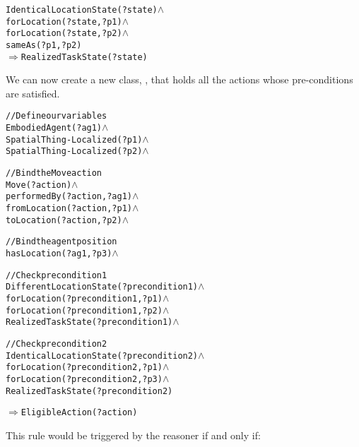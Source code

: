 \begin{alltt}

IdenticalLocationState(?state) \(\land\)
forLocation(?state, ?p1) \(\land\)
forLocation(?state, ?p2) \(\land\)
sameAs(?p1, ?p2)
\(\Rightarrow\) RealizedTaskState(?state)

\end{alltt}



%

We can now create a new class, , that holds all the actions
whose pre-conditions are satisfied.

\begin{alltt}

//Define our variables
EmbodiedAgent(?ag1) \(\land\)
SpatialThing-Localized(?p1) \(\land\)
SpatialThing-Localized(?p2) \(\land\)

//Bind the Move action
Move(?action) \(\land\)
performedBy(?action, ?ag1) \(\land\)
fromLocation(?action, ?p1) \(\land\)
toLocation(?action, ?p2) \(\land\)

//Bind the agent position
hasLocation(?ag1, ?p3) \(\land\)

//Check precondition 1
DifferentLocationState(?precondition1) \(\land\)
forLocation(?precondition1, ?p1) \(\land\)
forLocation(?precondition1, ?p2) \(\land\)
RealizedTaskState(?precondition1) \(\land\)

//Check precondition 2
IdenticalLocationState(?precondition2) \(\land\)
forLocation(?precondition2, ?p1) \(\land\)
forLocation(?precondition2, ?p3) \(\land\)
RealizedTaskState(?precondition2)

\(\Rightarrow\) EligibleAction(?action)

\end{alltt}

This rule would be triggered by the reasoner if and only if:

